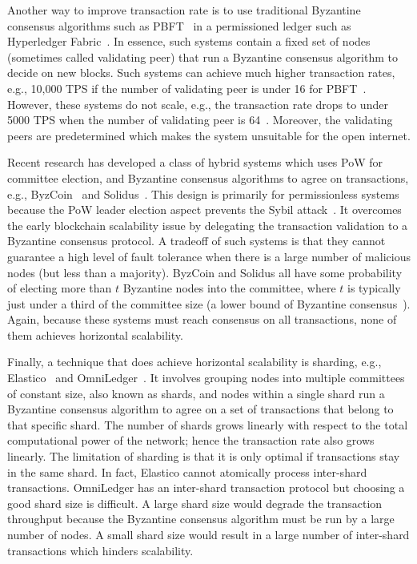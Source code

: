 Another way to improve transaction rate is to use traditional Byzantine consensus algorithms such as PBFT~\cite{castro1999practical} in a permissioned ledger such as Hyperledger Fabric~\cite{cachin2016architecture}.
In essence, such systems contain a fixed set of nodes (sometimes called validating peer) that run a Byzantine consensus algorithm to decide on new blocks.
Such systems can achieve much higher transaction rates, e.g., 10,000 TPS if the number of validating peer is under 16 for PBFT~\cite[Section 5.2]{miller2016honey}.
However, these systems do not scale, e.g., the transaction rate drops to under 5000 TPS when the number of validating peer is 64~\cite[Section 5.2]{miller2016honey}.
Moreover, the validating peers are predetermined which makes the system unsuitable for the open internet.

Recent research has developed a class of hybrid systems which uses PoW for committee election,
and Byzantine consensus algorithms to agree on transactions, e.g., ByzCoin~\cite{kogias2016enhancing} and Solidus~\cite{abraham2016solidus}.
This design is primarily for permissionless systems because the PoW leader election aspect prevents the Sybil attack~\cite{douceur2002sybil}.
It overcomes the early blockchain scalability issue by delegating the transaction validation to a Byzantine consensus protocol.
A tradeoff of such systems is that they cannot guarantee a high level of fault tolerance when there is a large number of malicious nodes (but less than a majority).
ByzCoin and Solidus all have some probability of electing more than $t$ Byzantine nodes into the committee,
where $t$ is typically just under a third of the committee size (a lower bound of Byzantine consensus~\cite{pease1980reaching}).
Again, because these systems must reach consensus on all transactions,
none of them achieves horizontal scalability.

Finally, a technique that does achieve horizontal scalability is sharding, e.g., Elastico~\cite{luu2016elastico} and OmniLedger~\cite{kokoris2017omniledger}.
It involves grouping nodes into multiple committees of constant size, also known as shards,
and nodes within a single shard run a Byzantine consensus algorithm to agree on a set of transactions that belong to that specific shard.
The number of shards grows linearly with respect to the total computational power of the network;
hence the transaction rate also grows linearly.
The limitation of sharding is that it is only optimal if transactions stay in the same shard.
In fact, Elastico cannot atomically process inter-shard transactions.
OmniLedger has an inter-shard transaction protocol but choosing a good shard size is difficult.
A large shard size would degrade the transaction throughput because the Byzantine consensus algorithm must be run by a large number of nodes.
A small shard size would result in a large number of inter-shard transactions which hinders scalability.

